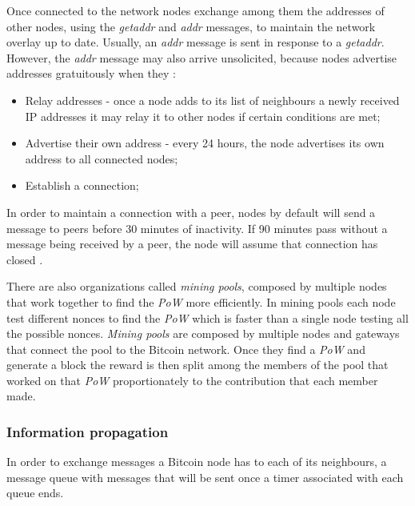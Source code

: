  Once connected to the network nodes exchange among them the addresses of other nodes, using the \textit{getaddr} and \textit{addr} messages, to maintain the network overlay up to date.
Usually, an \textit{addr} message is sent in response to a \textit{getaddr}. However, the \textit{addr} message may also arrive unsolicited, because nodes advertise addresses gratuitously when they \cite{bitcoinwiki}:
\begin{itemize}
\item Relay addresses - once a node adds to its list of neighbours a newly received IP addresses it may relay it to other nodes if certain conditions are met;
\item Advertise their own address - every 24 hours, the node advertises its own address to all connected nodes;
\item Establish a connection;
\end{itemize}
In order to maintain a connection with a peer, nodes by default will send a message to peers before 30 minutes of inactivity. If 90 minutes pass without a message being received by a peer, the node will assume that connection has closed \cite{bitcoincorewiki}.

There are also organizations called \textit{mining pools}, composed by multiple nodes that work together to find the \textit{PoW} more efficiently. In mining pools each node test different nonces to find the \textit{PoW} which is faster than a single node testing all the possible nonces. \textit{Mining pools} are composed by multiple nodes and gateways that connect the pool to the Bitcoin network. Once they find a \textit{PoW} and generate a block the reward is then split among the members of the pool that worked on that \textit{PoW} proportionately to the contribution that each member made.
\subsubsection*{Information propagation}
\label{sec:dataexchange}
In order to exchange messages a Bitcoin node has to each of its neighbours, a message queue with messages that will be sent once a timer associated with each queue ends.

